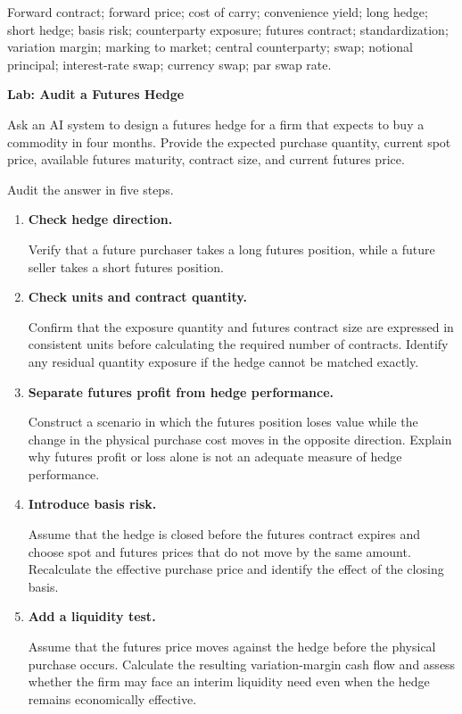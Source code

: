 
Forward contract; forward price; cost of carry; convenience yield;
long hedge; short hedge; basis risk; counterparty exposure;
futures contract; standardization; variation margin; marking to market;
central counterparty;
swap; notional principal; interest-rate swap; currency swap;
par swap rate.



\textbf{Lab: Audit a Futures Hedge}

Ask an AI system to design a futures hedge for a firm that expects to buy a commodity in four months. Provide the expected purchase quantity, current spot price, available futures maturity, contract size, and current futures price.

Audit the answer in five steps.

\begin{enumerate}

\item \textbf{Check hedge direction.}

Verify that a future purchaser takes a long futures position, while a future seller takes a short futures position.

\item \textbf{Check units and contract quantity.}

Confirm that the exposure quantity and futures contract size are expressed in consistent units before calculating the required number of contracts. Identify any residual quantity exposure if the hedge cannot be matched exactly.

\item \textbf{Separate futures profit from hedge performance.}

Construct a scenario in which the futures position loses value while the change in the physical purchase cost moves in the opposite direction. Explain why futures profit or loss alone is not an adequate measure of hedge performance.

\item \textbf{Introduce basis risk.}

Assume that the hedge is closed before the futures contract expires and choose spot and futures prices that do not move by the same amount. Recalculate the effective purchase price and identify the effect of the closing basis.

\item \textbf{Add a liquidity test.}

Assume that the futures price moves against the hedge before the physical purchase occurs. Calculate the resulting variation-margin cash flow and assess whether the firm may face an interim liquidity need even when the hedge remains economically effective.

\end{enumerate}

